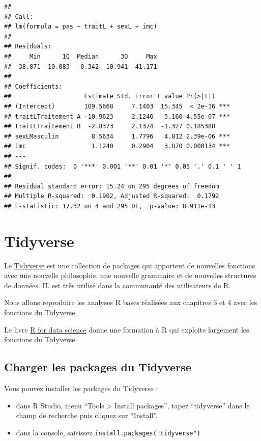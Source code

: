 \documentclass[
]{book}
\providecommand{\tightlist}{%
  \setlength{\itemsep}{0pt}\setlength{\parskip}{0pt}}
\begin{document}
\begin{verbatim}
## 
## Call:
## lm(formula = pas ~ traitL + sexL + imc)
## 
## Residuals:
##     Min      1Q  Median      3Q     Max 
## -38.871 -10.083  -0.342  10.941  41.171 
## 
## Coefficients:
##                    Estimate Std. Error t value Pr(>|t|)    
## (Intercept)        109.5668     7.1403  15.345  < 2e-16 ***
## traitLTraitement A -10.9623     2.1246  -5.160 4.55e-07 ***
## traitLTraitement B  -2.8373     2.1374  -1.327 0.185388    
## sexLMasculin         8.5634     1.7796   4.812 2.39e-06 ***
## imc                  1.1240     0.2904   3.870 0.000134 ***
## ---
## Signif. codes:  0 '***' 0.001 '**' 0.01 '*' 0.05 '.' 0.1 ' ' 1
## 
## Residual standard error: 15.24 on 295 degrees of freedom
## Multiple R-squared:  0.1902, Adjusted R-squared:  0.1792 
## F-statistic: 17.32 on 4 and 295 DF,  p-value: 8.911e-13
\end{verbatim}

\chapter{Tidyverse}\label{tidyverse}

Le \href{https://www.tidyverse.org/}{Tidyverse} est une collection de packages qui apportent de nouvelles fonctions avec une nouvelle philosophie, une nouvelle grammaire et de nouvelles structures de données. IL est très utilisé dans la communauté des utilisateurs de R.

Nous allons reproduire les analyses R bases réalisées aux chapitres 3 et 4 avec les fonctions du Tidyverse.

Le livre \href{https://r4ds.hadley.nz/}{R for data science} donne une formation à R qui exploite largement les fonctions du Tidyverse.

\section{Charger les packages du Tidyverse}\label{charger-les-packages-du-tidyverse}

Vous pouvez installer les packages du Tidyverse :

\begin{itemize}
\tightlist
\item
  dans R Studio, menu ``Tools \textgreater{} Install packages'', tapez ``tidyverse'' dans le champ de recherche puis cliquez sur ``Install''.
\item
  dans la console, saisissez \texttt{install.packages("tidyverse")}
\end{itemize}
\end{document}
